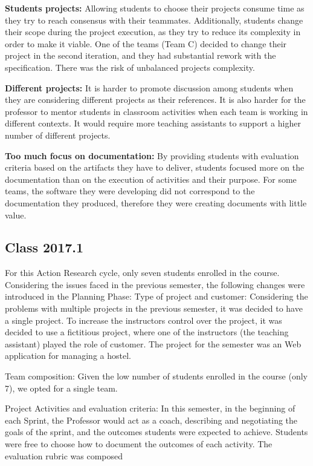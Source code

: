 \textbf{Students projects:} Allowing students to choose their projects consume time as they try to reach consensus with their teammates. Additionally, students change their scope during the project execution, as they try to reduce its complexity in order to make it viable. One of the teams (Team C) decided to change their project in the second iteration, and they had substantial rework with the specification. There was the risk of unbalanced projects complexity.

\textbf{Different projects:} It is harder to promote discussion among students when they are considering different projects as their references. It is also harder for the professor to mentor students in classroom activities when each team is working in different contexts. It would require more teaching assistants to support a higher number of different projects.

\textbf{Too much focus on documentation:} By providing students with evaluation criteria based on the artifacts they have to deliver, students focused more on the documentation than on the execution of activities and their purpose. For some teams, the software they were developing did not correspond to the documentation they produced, therefore they were creating documents with little value.

\subsection{Class 2017.1}

For this Action Research cycle, only seven students enrolled in the course. Considering the issues faced in the previous semester, the following changes were introduced in the Planning Phase:
Type of project and customer: Considering the problems with multiple projects in the previous semester, it was decided to have a single project. To increase the instructors control over the project, it was decided to use a fictitious project, where one of the instructors (the teaching assistant) played the role of customer. The project for the semester was an Web application for managing a hostel.

Team composition: Given the low number of students enrolled in the course (only 7), we opted for a single team.

Project Activities and evaluation criteria: In this semester, in the beginning of each Sprint, the Professor would act as a coach, describing and negotiating the goals of the sprint, and the outcomes students were expected to achieve. Students were free to choose how to document the outcomes of each activity. The evaluation rubric was composed 

